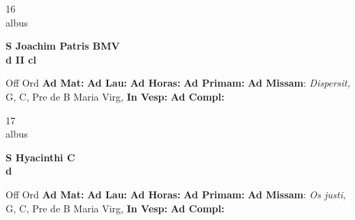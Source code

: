 \documentclass[10pt, openany]{book}
\begin{document}
    \begin{center}
        \begin{minipage}{3.5in}
            \vspace{2em}
            \begin{minipage}{0.5in}
                {\Huge 16} \\
                {\normalsize albus}
            \end{minipage}
            \begin{minipage}{3.0in}
                \textbf{ \large S Joachim Patris BMV \\
                \textnormal{\normalsize d II cl}}

            \end{minipage}
            \begin{justify}Off Ord
                \textbf{Ad Mat: }
                \textbf{Ad Lau: }
                \textbf{Ad Horas: }
                \textbf{Ad Primam: }\textbf{Ad Missam}: \textit{Dispersit,} G, C, Pre de B Maria Virg, 
                \textbf{In Vesp: }
                \textbf{Ad Compl: }
            \end{justify}
        \end{minipage}
    \end{center}

    \begin{center}
        \begin{minipage}{3.5in}
            \vspace{2em}
            \begin{minipage}{0.5in}
                {\Huge 17} \\
                {\normalsize albus}
            \end{minipage}
            \begin{minipage}{3.0in}
                \textbf{ \large S Hyacinthi C \\
                \textnormal{\normalsize d}}

            \end{minipage}
            \begin{justify}Off Ord
                \textbf{Ad Mat: }
                \textbf{Ad Lau: }
                \textbf{Ad Horas: }
                \textbf{Ad Primam: }\textbf{Ad Missam}: \textit{Os justi,} G, C, Pre de B Maria Virg, 
                \textbf{In Vesp: }
                \textbf{Ad Compl: }
            \end{justify}
        \end{minipage}
    \end{center}
\end{document}
